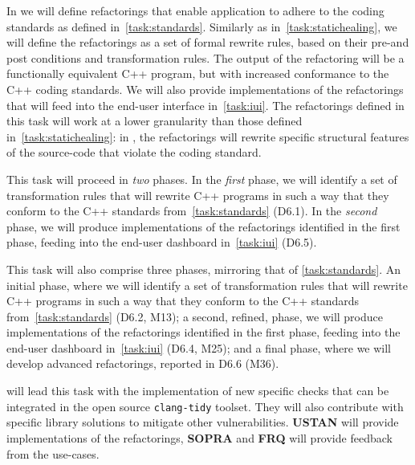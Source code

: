 \begin{Workpackage}{\thewpno}
\begin{Task}


	\TaskResults{%
	}
	\TaskHeader{}
	
        
     	In \theTask{} we will define refactorings that enable application to adhere to the coding standards as defined in~\ref{task:standards}. Similarly as in~\ref{task:statichealing}, we will define the refactorings as a set of formal rewrite rules, based on their pre-and post conditions and transformation rules. The output of the refactoring will be a functionally equivalent C++ program, but with increased conformance to the C++ coding standards. We will also provide implementations of the refactorings that will feed into the end-user interface in~\ref{task:iui}. The refactorings defined in this task will work at a lower granularity than those defined in~\ref{task:statichealing}: in \theTask{}, the refactorings will rewrite specific structural features of the source-code that violate the coding standard. 
     
     This task will proceed in \emph{two} phases. In the \emph{first} phase, we will identify a set of transformation rules that will rewrite C++ programs in such a way that they conform to the C++ standards from~\ref{task:standards} (D6.1). In the \emph{second} phase, we will produce implementations of the refactorings identified in the first phase, feeding into the end-user dashboard in~\ref{task:iui} (D6.5).
     
     This task will also comprise three phases, mirroring that of \ref{task:standards}. An initial phase, where we will identify a set of transformation rules that will rewrite C++ programs in such a way that they conform to the C++ standards from~\ref{task:standards} (D6.2, M13);  a second, refined, phase, we will produce implementations of the refactorings identified in the first phase, feeding into the end-user dashboard in~\ref{task:iui} (D6.4, M25); and a final phase, where we will develop advanced refactorings, reported in D6.6 (M36).

        \UCMshort{} will lead this task with the implementation
        of new specific checks that can be integrated in the open source
        \texttt{clang-tidy} toolset. They will also contribute with specific
        library solutions to mitigate other vulnerabilities.  \textbf{USTAN} will provide implementations of the refactorings, \textbf{SOPRA} and \textbf{FRQ} will provide feedback from the use-cases.
\end{Task}


\end{Workpackage}
